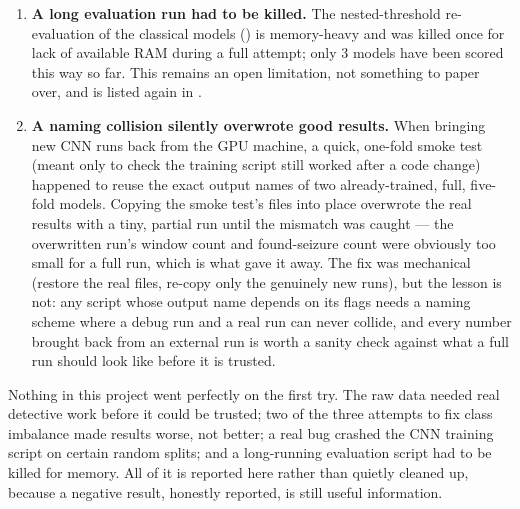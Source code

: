 \begin{enumerate}[leftmargin=1.4em]
    outcome is reported as the finding it is, in , rather than reframed
    as a near-win.
  \item \textbf{A long evaluation run had to be killed.} The nested-threshold re-evaluation of
    the classical models () is memory-heavy and was killed once for lack of
    available RAM during a full attempt; only 3 models have been scored this way so far. This
    remains an open limitation, not something to paper over, and is listed again in
    .
  \item \textbf{A naming collision silently overwrote good results.} When bringing new CNN runs
    back from the GPU machine, a quick, one-fold smoke test (meant only to check the training
    script still worked after a code change) happened to reuse the exact output names of two
    already-trained, full, five-fold models. Copying the smoke test's files into place overwrote
    the real results with a tiny, partial run until the mismatch was caught --- the overwritten
    run's window count and found-seizure count were obviously too small for a full run, which is
    what gave it away. The fix was mechanical (restore the real files, re-copy only the genuinely
    new runs), but the lesson is not: any script whose output name depends on its flags needs a
    naming scheme where a debug run and a real run can never collide, and every number brought
    back from an external run is worth a sanity check against what a full run should look like
    before it is trusted.
\end{enumerate}

\begin{summarybox}
Nothing in this project went perfectly on the first try. The raw data needed real detective
work before it could be trusted; two of the three attempts to fix class imbalance made results
worse, not better; a real bug crashed the CNN training script on certain random splits; and a
long-running evaluation script had to be killed for memory. All of it is reported here rather
than quietly cleaned up, because a negative result, honestly reported, is still useful
information.
\end{summarybox}
